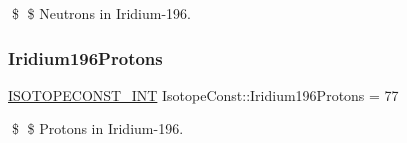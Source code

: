 \$ \$ Neutrons in Iridium-\/196. \mbox{\label{group___isotope_const-_iridium-_ir196_ga3581064028f529ee79ed9ad60b09abc4}} 
\subsubsection{\texorpdfstring{Iridium196\+Protons}{Iridium196Protons}}
{\footnotesize\ttfamily \mbox{\hyperlink{group___isotope_const-_macros_ga5f18360b3e99483a35c32d789e62621c}{I\+S\+O\+T\+O\+P\+E\+C\+O\+N\+S\+T\+\_\+\+I\+NT}} Isotope\+Const\+::\+Iridium196\+Protons = 77}

\$ \$ Protons in Iridium-\/196. 